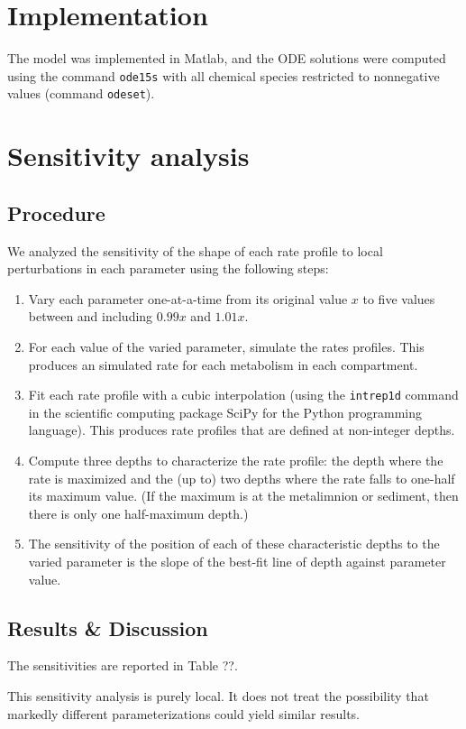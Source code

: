 \documentclass{report}
\begin{document}
\section{Implementation}
The model was implemented in Matlab, and the ODE solutions were computed using the command {\tt ode15s} with all chemical species restricted to nonnegative values (command {\tt odeset}).

\section{Sensitivity analysis}
\subsection{Procedure}
We analyzed the sensitivity of the shape of each rate profile to local perturbations in each parameter using the following steps:

\begin{enumerate}
\item Vary each parameter one-at-a-time from its original value $x$ to five values between and including $0.99x$ and $1.01x$.
\item For each value of the varied parameter, simulate the rates profiles. This produces an simulated rate for each metabolism in each compartment.
\item Fit each rate profile with a cubic interpolation (using the {\tt intrep1d} command in the scientific computing package SciPy for the Python programming language). This produces rate profiles that are defined at non-integer depths.
\item Compute three depths to characterize the rate profile: the depth where the rate is maximized and the (up to) two depths where the rate falls to one-half its maximum value. (If the maximum is at the metalimnion or sediment, then there is only one half-maximum depth.)
\item The sensitivity of the position of each of these characteristic depths to the varied parameter is the slope of the best-fit line of depth against parameter value.
\end{enumerate}

\subsection{Results \& Discussion}
The sensitivities are reported in Table ??.

This sensitivity analysis is purely local. It does not treat the possibility that markedly different parameterizations could yield similar results.



\end{document}
